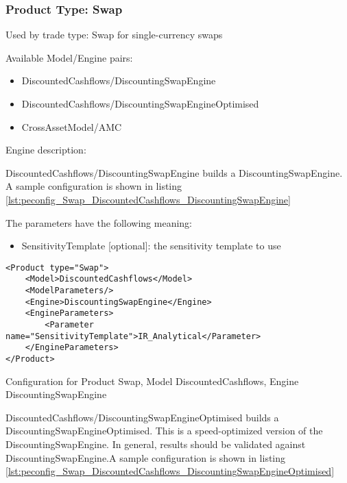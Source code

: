 \subsubsection{Product Type: Swap}

Used by trade type: Swap for single-currency swaps

Available Model/Engine pairs:

\begin{itemize}
\item DiscountedCashflows/DiscountingSwapEngine
\item DiscountedCashflows/DiscountingSwapEngineOptimised  
\item CrossAssetModel/AMC
\end{itemize}

Engine description:

DiscountedCashflows/DiscountingSwapEngine builds a DiscountingSwapEngine. A sample configuration is shown in listing
\ref{lst:peconfig_Swap_DiscountedCashflows_DiscountingSwapEngine}

The parameters have the following meaning:

\begin{itemize}
\item SensitivityTemplate [optional]: the sensitivity template to use 
\end{itemize}

\begin{longlisting}
\begin{verbatim}
<Product type="Swap">
    <Model>DiscountedCashflows</Model>
    <ModelParameters/>
    <Engine>DiscountingSwapEngine</Engine>
    <EngineParameters>
        <Parameter name="SensitivityTemplate">IR_Analytical</Parameter>
    </EngineParameters>
</Product>
\end{verbatim}
\caption{Configuration for Product Swap, Model DiscountedCashflows, Engine DiscountingSwapEngine}
\label{lst:peconfig_Swap_DiscountedCashflows_DiscountingSwapEngine}
\end{longlisting}

DiscountedCashflows/DiscountingSwapEngineOptimised builds a DiscountingSwapEngineOptimised. This is a speed-optimized
version of the DiscountingSwapEngine. In general, results should be validated against DiscountingSwapEngine.A sample
configuration is shown in listing \ref{lst:peconfig_Swap_DiscountedCashflows_DiscountingSwapEngineOptimised}

